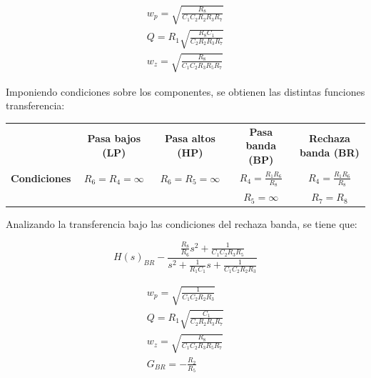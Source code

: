 \begin{equation}
    \begin{matrix}
        w_{p} = \sqrt{\frac{R_{8}}{C_{1}C_{2}R_{2}R_{3}R_{7}}}
        \\
        Q = R_{1}\sqrt{\frac{R_{8}C_{1}}{C_{2}R_{2}R_{3}R_{7}}}
        \\
        w_{z} = \sqrt{\frac{R_{8}}{C_{1}C_{2}R_{3}R_{5}R_{7}}}
    \end{matrix}
    \label{eq:FT2}
\end{equation}

Imponiendo condiciones sobre los componentes, se obtienen las distintas funciones transferencia:

\begin{table}[H]
\begin{tabular}{c|cccc}
                     & \textbf{Pasa bajos (LP)} & \textbf{Pasa altos (HP)} & \textbf{Pasa banda (BP)}           & \textbf{Rechaza banda (BR)}        \\ \cline{2-5} 
\textbf{Condiciones} & $R_{6} = R_{4} = \infty$ & $R_{6} = R_{5} = \infty$ & $R_{4} = \frac{R_{1}R_{6}}{R_{8}}$ & $R_{4} = \frac{R_{1}R_{6}}{R_{8}}$ \\
                     &                          &                          & $R_{5} = \infty$                   & $R_{7} = R_{8}$                   
\end{tabular}
\end{table}

Analizando la transferencia bajo las condiciones del rechaza banda, se tiene que:

\begin{equation}
        H(s)_{BR} -\frac{\frac{R_{8}}{R_{6}}s^{2} + \frac{1}{C_{1}C_{2}R_{3}R_{5}}}{s^{2} + \frac{1}{R_{1}C_{1}} s + \frac{1}{C_{1}C_{2}R_{2}R_{3}}}
    \label{eq:FT3}
\end{equation}

\begin{equation}
    \begin{matrix}
        w_{p} = \sqrt{\frac{1}{C_{1}C_{2}R_{2}R_{3}}}
        \\
        Q = R_{1}\sqrt{\frac{C_{1}}{C_{2}R_{2}R_{3}R_{7}}}
        \\
        w_{z} = \sqrt{\frac{R_{8}}{C_{1}C_{2}R_{3}R_{5}R_{7}}}
        \\
        G_{BR} = -\frac{R_{2}}{R_{5}}

    \end{matrix}
    \label{eq:FT4}
\end{equation}


